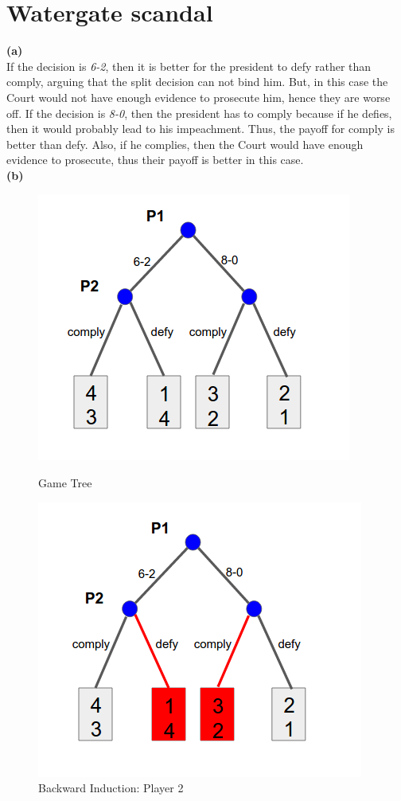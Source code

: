 \documentclass{article}
\begin{document}
\section{Watergate scandal}
\textbf{(a)} \\
If the decision is \emph{6-2}, then it is better for the president to defy rather than comply, arguing that the split decision can not bind him. But, in this case the Court would not have enough evidence to prosecute him, hence they are worse off. If the decision is \emph{8-0}, then the president has to comply because if he defies, then it would probably lead to his impeachment. Thus, the payoff for comply is better than defy. Also, if he complies, then the Court would have enough evidence to prosecute, thus their payoff is better in this case.\\
\textbf{(b)}
\begin{figure}[h!]
\centering
\begin{multicols}{3}
\label{2_gt1}
\includegraphics[width=1\columnwidth]{2_gt1.png}
\caption{Game Tree}


\includegraphics[width=1\columnwidth]{2_gt2.png}
\caption{Backward Induction: Player 2}
\label{2_gt2}



\end{multicols}
\end{figure}
\end{document}
